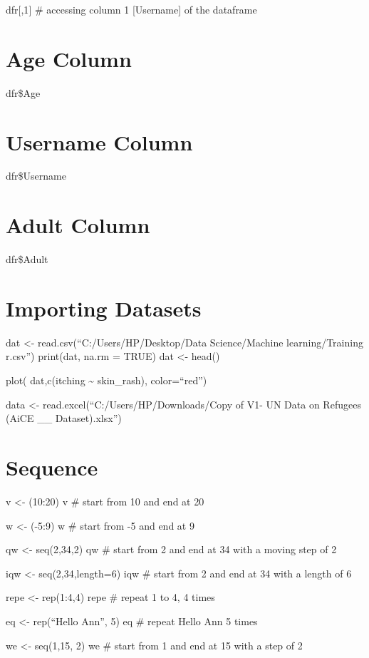 \documentclass[
]{article}
\begin{document}
dfr{[},1{]} \# accessing column 1 {[}Username{]} of the dataframe

\section{Age Column}\label{age-column}

dfr\$Age

\section{Username Column}\label{username-column}

dfr\$Username

\section{Adult Column}\label{adult-column}

dfr\$Adult

\section{Importing Datasets}\label{importing-datasets}

dat \textless- read.csv(``C:/Users/HP/Desktop/Data Science/Machine
learning/Training r.csv'') print(dat, na.rm = TRUE) dat \textless-
head()

plot( dat,c(itching \textasciitilde{} skin\_rash), color=``red'')

data \textless- read.excel(``C:/Users/HP/Downloads/Copy of V1- UN Data
on Refugees (AiCE \_\_ Dataset).xlsx'')

\section{Sequence}\label{sequence}

v \textless- (10:20) v \# start from 10 and end at 20

w \textless- (-5:9) w \# start from -5 and end at 9

qw \textless- seq(2,34,2) qw \# start from 2 and end at 34 with a moving
step of 2

iqw \textless- seq(2,34,length=6) iqw \# start from 2 and end at 34 with
a length of 6

repe \textless- rep(1:4,4) repe \# repeat 1 to 4, 4 times

eq \textless- rep(``Hello Ann'', 5) eq \# repeat Hello Ann 5 times

we \textless- seq(1,15, 2) we \# start from 1 and end at 15 with a step
of 2
\end{document}
